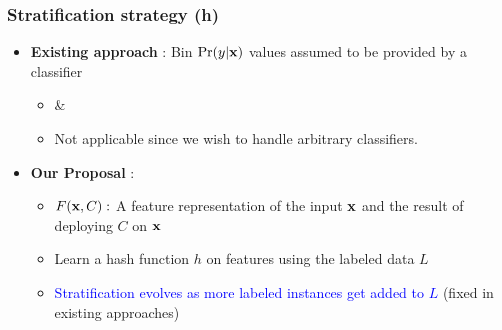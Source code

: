 \documentclass[usenames,dvipsnames, 11pt]{beamer}
\newcommand{\vek}[1]{{\bf {#1}}}
\newcommand{\vx}{{\vek{x}}}
\newlength{\wideitemsep}
\let\olditem\item
\renewcommand{\item}{\setlength{\itemsep}{\wideitemsep}\olditem}
\begin{document}
\begin{frame}
\frametitle{Stratification strategy (h)}
\begin{itemize}
\pause
\item \textbf{Existing approach} : Bin $\Pr(y|\vx)$ values assumed to be provided by a classifier 
  \begin{itemize}
  \item \citeauthor{bennett10} \& \citeauthor{druck11} %
  \item Not applicable since we wish to handle arbitrary classifiers.
  \end{itemize}
  \pause  
\item \textbf{Our Proposal} : 
  \begin{itemize}
  \pause
  \item $F(\vx,C):$ A feature representation of the input $\vx$ and the result of deploying $C$ on  $\vx$
  \item Learn a hash function $h$ on features using the labeled data $L$
  \item \textcolor{Blue}{Stratification evolves as more labeled instances get added to $L$} (fixed in existing approaches)
  \end{itemize}
\end{itemize}
\end{frame}
\end{document}
